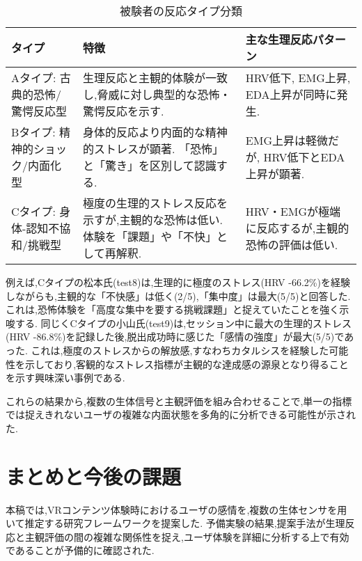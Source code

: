 \documentclass[a4paper]{jlreq}
\begin{document}
\begin{table}[tb]
\caption{被験者の反応タイプ分類}
\label{table:types}
\begin{center}\small
\def\arraystretch{1.2}
\begin{tabular}{|p{4em}|p{10em}|p{7em}|} \hline
\textbf{タイプ} & \textbf{特徴} & \textbf{主な生理反応パターン} \\ \hline \hline
Aタイプ: \newline 古典的恐怖/驚愕反応型 & 生理反応と主観的体験が一致し,脅威に対し典型的な恐怖・驚愕反応を示す. & HRV低下, EMG上昇, EDA上昇が同時に発生. \\ \hline
Bタイプ: \newline 精神的ショック/内面化型 & 身体的反応より内面的な精神的ストレスが顕著. 「恐怖」と「驚き」を区別して認識する. & EMG上昇は軽微だが, HRV低下とEDA上昇が顕著. \\ \hline
Cタイプ: \newline 身体-認知不協和/挑戦型 & 極度の生理的ストレス反応を示すが,主観的な恐怖は低い. 体験を「課題」や「不快」として再解釈. & HRV・EMGが極端に反応するが,主観的恐怖の評価は低い. \\ \hline
\end{tabular}
\end{center}
\vspace*{-3mm}
\end{table}

例えば,Cタイプの松本氏(test8)は,生理的に極度のストレス(HRV -66.2\%)を経験しながらも,主観的な「不快感」は低く(2/5),「集中度」は最大(5/5)と回答した. これは,恐怖体験を「高度な集中を要する挑戦課題」と捉えていたことを強く示唆する. 同じくCタイプの小山氏(test9)は,セッション中に最大の生理的ストレス(HRV -86.8\%)を記録した後,脱出成功時に感じた「感情の強度」が最大(5/5)であった. これは,極度のストレスからの解放感,すなわちカタルシスを経験した可能性を示しており,客観的なストレス指標が主観的な達成感の源泉となり得ることを示す興味深い事例である.

これらの結果から,複数の生体信号と主観評価を組み合わせることで,単一の指標では捉えきれないユーザの複雑な内面状態を多角的に分析できる可能性が示された.

\balance

\section{まとめと今後の課題}

本稿では,VRコンテンツ体験時におけるユーザの感情を,複数の生体センサを用いて推定する研究フレームワークを提案した. 予備実験の結果,提案手法が生理反応と主観評価の間の複雑な関係性を捉え,ユーザ体験を詳細に分析する上で有効であることが予備的に確認された.
\end{document}
